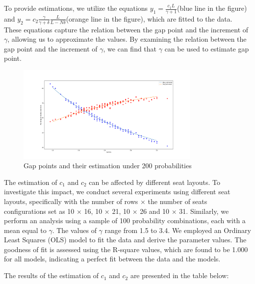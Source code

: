 To provide estimations, we utilize the equations $y_1 = \frac{c_1 L}{\gamma +1}$(blue line in the figure) and $y_2 = c_2 \frac{\gamma}{\gamma + \delta} \frac{L}{L-N \delta}$(orange line in the figure), which are fitted to the data. These equations capture the relation between the gap point and the increment of $\gamma$, allowing us to approximate the values. By examining the relation between the gap point and the increment of $\gamma$, we can find that $\gamma$ can be used to estimate gap point.

\begin{figure}[ht]
  \centering
    \includegraphics[width=0.8\textwidth]{./Figures/re2.pdf}
  \caption{Gap points and their estimation under 200 probabilities}
\end{figure}



The estimation of $c_1$ and $c_2$ can be affected by different seat layouts. To investigate this impact, we conduct several experiments using different seat layouts, specifically with the number of rows $\times$ the number of seats configurations set as 10 $\times$ 16, 10 $\times$ 21, 10 $\times$ 26 and 10 $\times$ 31. Similarly, we perform an analysis using a sample of 100 probability combinations, each with a mean equal to $\gamma$. The values of $\gamma$ range from 1.5 to 3.4. We employed an Ordinary Least Squares (OLS) model to fit the data and derive the parameter values. The goodness of fit is assessed using the R-square values, which are found to be 1.000 for all models, indicating a perfect fit between the data and the models.

The results of the estimation of $c_1$ and $c_2$ are presented in the table below:

